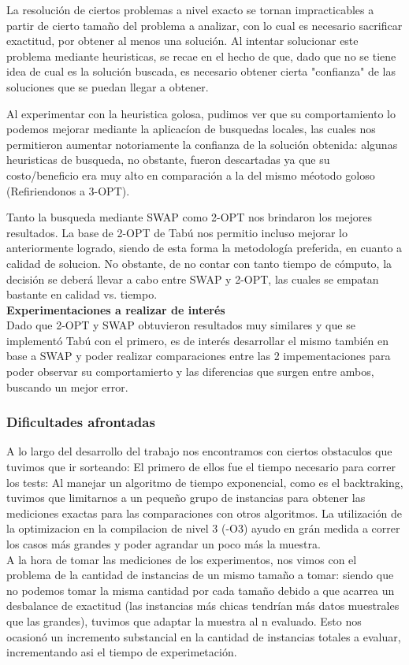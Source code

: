 La resolución de ciertos problemas a nivel exacto se tornan impracticables a partir de cierto tamaño del problema a analizar, con lo cual es necesario sacrificar exactitud, por obtener al menos una solución. Al intentar solucionar este problema mediante heuristicas, se recae en el hecho de que, dado que no se tiene idea de cual es la solución buscada, es necesario obtener cierta "confianza" de las soluciones que se puedan llegar a obtener.

Al experimentar con la heuristica golosa, pudimos ver que su comportamiento lo podemos mejorar mediante la aplicacíon de busquedas locales, las cuales nos permitieron aumentar notoriamente la confianza de la solución obtenida: algunas heuristicas de busqueda, no obstante, fueron descartadas ya que  su costo/beneficio era muy alto en comparación a la del mismo méotodo goloso (Refiriendonos a 3-OPT). 

Tanto la busqueda mediante SWAP como 2-OPT nos brindaron los mejores resultados. La base de 2-OPT de Tabú nos permitio incluso mejorar lo anteriormente logrado, siendo de esta forma la metodología preferida, en cuanto a calidad de solucion. No obstante, de no contar con tanto tiempo de cómputo, la decisi\'on se deberá llevar a cabo entre SWAP y 2-OPT, las cuales se empatan bastante en calidad vs. tiempo.\\

\textbf{Experimentaciones a realizar de interés}\\
Dado que 2-OPT y SWAP obtuvieron resultados muy similares y que se implementó Tabú con el primero, es de interés desarrollar el mismo también en base a SWAP y poder realizar comparaciones entre las 2 impementaciones para poder observar su comportamierto y las diferencias que surgen entre ambos, buscando un mejor error.


\subsubsection{Dificultades afrontadas}

A lo largo del desarrollo del trabajo nos encontramos con ciertos obstaculos que tuvimos que ir sorteando:
El primero de ellos fue el tiempo necesario para correr los tests: Al manejar un algoritmo de tiempo exponencial, como es el backtraking, tuvimos que limitarnos a un pequeño grupo de instancias para obtener las mediciones exactas para las comparaciones con otros algoritmos. La utilización de la optimizacion  en la compilacion de nivel 3 (-O3) ayudo en grán medida a correr los casos más grandes y poder agrandar un poco más la muestra.\\
A la hora de tomar las mediciones de los experimentos, nos vimos con el problema de la cantidad de instancias de un mismo tamaño a tomar: siendo que no podemos tomar la misma cantidad por cada tamaño debido a que acarrea un desbalance de exactitud (las instancias más chicas tendrían más datos muestrales que las grandes), tuvimos que adaptar la muestra al n evaluado. Esto nos ocasionó un incremento substancial en la cantidad de instancias totales a evaluar, incrementando asi el tiempo de experimetación.

